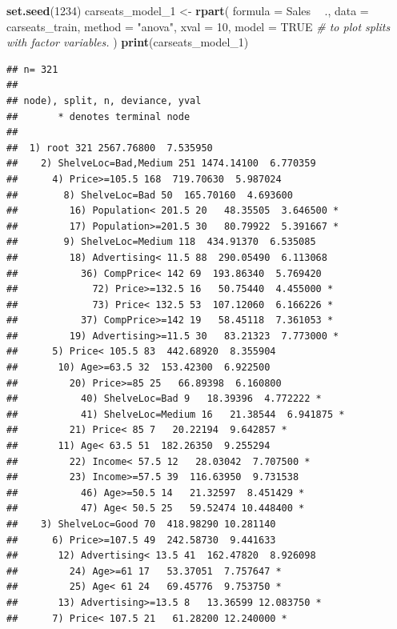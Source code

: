 \documentclass[
]{book}
\newenvironment{Shaded}{\begin{snugshade}}{\end{snugshade}}
\newcommand{\CommentTok}[1]{\textcolor[rgb]{0.56,0.35,0.01}{\textit{#1}}}
\newcommand{\DataTypeTok}[1]{\textcolor[rgb]{0.13,0.29,0.53}{#1}}
\newcommand{\DecValTok}[1]{\textcolor[rgb]{0.00,0.00,0.81}{#1}}
\newcommand{\KeywordTok}[1]{\textcolor[rgb]{0.13,0.29,0.53}{\textbf{#1}}}
\newcommand{\NormalTok}[1]{#1}
\newcommand{\OperatorTok}[1]{\textcolor[rgb]{0.81,0.36,0.00}{\textbf{#1}}}
\newcommand{\OtherTok}[1]{\textcolor[rgb]{0.56,0.35,0.01}{#1}}
\newcommand{\StringTok}[1]{\textcolor[rgb]{0.31,0.60,0.02}{#1}}
\begin{document}
\begin{Shaded}
\begin{Highlighting}[]
\KeywordTok{set.seed}\NormalTok{(}\DecValTok{1234}\NormalTok{)}
\NormalTok{carseats_model_}\DecValTok{1}\NormalTok{ <-}\StringTok{ }\KeywordTok{rpart}\NormalTok{(}
   \DataTypeTok{formula =}\NormalTok{ Sales }\OperatorTok{~}\StringTok{ }\NormalTok{.,}
   \DataTypeTok{data =}\NormalTok{ carseats_train,}
   \DataTypeTok{method =} \StringTok{"anova"}\NormalTok{, }
   \DataTypeTok{xval =} \DecValTok{10}\NormalTok{,}
   \DataTypeTok{model =} \OtherTok{TRUE}  \CommentTok{# to plot splits with factor variables.}
\NormalTok{)}
\KeywordTok{print}\NormalTok{(carseats_model_}\DecValTok{1}\NormalTok{)}
\end{Highlighting}
\end{Shaded}

\begin{verbatim}
## n= 321 
## 
## node), split, n, deviance, yval
##       * denotes terminal node
## 
##  1) root 321 2567.76800  7.535950  
##    2) ShelveLoc=Bad,Medium 251 1474.14100  6.770359  
##      4) Price>=105.5 168  719.70630  5.987024  
##        8) ShelveLoc=Bad 50  165.70160  4.693600  
##         16) Population< 201.5 20   48.35505  3.646500 *
##         17) Population>=201.5 30   80.79922  5.391667 *
##        9) ShelveLoc=Medium 118  434.91370  6.535085  
##         18) Advertising< 11.5 88  290.05490  6.113068  
##           36) CompPrice< 142 69  193.86340  5.769420  
##             72) Price>=132.5 16   50.75440  4.455000 *
##             73) Price< 132.5 53  107.12060  6.166226 *
##           37) CompPrice>=142 19   58.45118  7.361053 *
##         19) Advertising>=11.5 30   83.21323  7.773000 *
##      5) Price< 105.5 83  442.68920  8.355904  
##       10) Age>=63.5 32  153.42300  6.922500  
##         20) Price>=85 25   66.89398  6.160800  
##           40) ShelveLoc=Bad 9   18.39396  4.772222 *
##           41) ShelveLoc=Medium 16   21.38544  6.941875 *
##         21) Price< 85 7   20.22194  9.642857 *
##       11) Age< 63.5 51  182.26350  9.255294  
##         22) Income< 57.5 12   28.03042  7.707500 *
##         23) Income>=57.5 39  116.63950  9.731538  
##           46) Age>=50.5 14   21.32597  8.451429 *
##           47) Age< 50.5 25   59.52474 10.448400 *
##    3) ShelveLoc=Good 70  418.98290 10.281140  
##      6) Price>=107.5 49  242.58730  9.441633  
##       12) Advertising< 13.5 41  162.47820  8.926098  
##         24) Age>=61 17   53.37051  7.757647 *
##         25) Age< 61 24   69.45776  9.753750 *
##       13) Advertising>=13.5 8   13.36599 12.083750 *
##      7) Price< 107.5 21   61.28200 12.240000 *
\end{verbatim}
\end{document}
